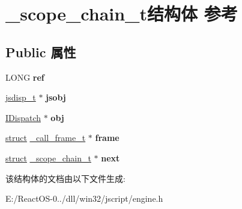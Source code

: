 \hypertarget{struct__scope__chain__t}{}\section{\+\_\+scope\+\_\+chain\+\_\+t结构体 参考}
\label{struct__scope__chain__t}
\subsection*{Public 属性}
\begin{DoxyCompactItemize}
\item 
\mbox{\label{struct__scope__chain__t_a215ba1d8072406997e861d05c1cf5baa}} 
L\+O\+NG {\bfseries ref}
\item 
\mbox{\label{struct__scope__chain__t_aaa67ff3a3879ba0a7a89cf53c1747202}} 
\hyperlink{structjsdisp__t}{jsdisp\+\_\+t} $\ast$ {\bfseries jsobj}
\item 
\mbox{\label{struct__scope__chain__t_a01344e573fda056747dcc1aff50cb506}} 
\hyperlink{interface_i_dispatch}{I\+Dispatch} $\ast$ {\bfseries obj}
\item 
\mbox{\label{struct__scope__chain__t_a24977958808d4808e359c290e98f6b33}} 
\hyperlink{interfacestruct}{struct} \hyperlink{struct__call__frame__t}{\+\_\+call\+\_\+frame\+\_\+t} $\ast$ {\bfseries frame}
\item 
\mbox{\label{struct__scope__chain__t_a5d16a251656713613a53bcf6bd00da46}} 
\hyperlink{interfacestruct}{struct} \hyperlink{struct__scope__chain__t}{\+\_\+scope\+\_\+chain\+\_\+t} $\ast$ {\bfseries next}
\end{DoxyCompactItemize}


该结构体的文档由以下文件生成\+:\begin{DoxyCompactItemize}
\item 
E\+:/\+React\+O\+S-\/0../dll/win32/jscript/engine.\+h\end{DoxyCompactItemize}
